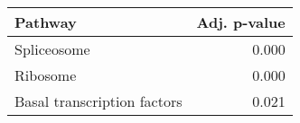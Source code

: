 \begin{tabular}{lr}
\toprule
                     Pathway &  Adj. p-value \\
\midrule
                 Spliceosome &         0.000 \\
                    Ribosome &         0.000 \\
 Basal transcription factors &         0.021 \\
\bottomrule
\end{tabular}
